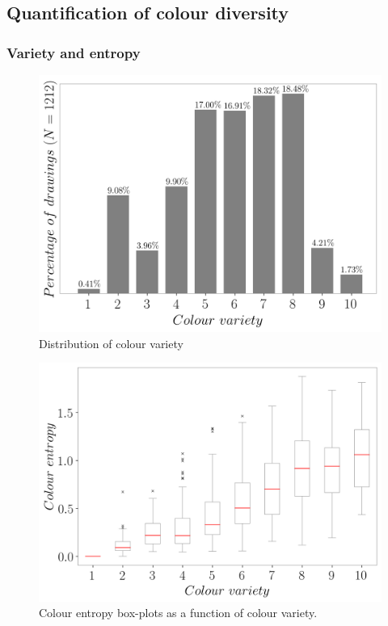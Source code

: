 \documentclass[11pt,a4paper]{article}
\begin{document}
\subsection{Quantification of colour diversity}
\label{sec:results_diversity}

\subsubsection{Variety and entropy}
\label{sec:results_entropy_variety}

\begin{figure}[h!]
	\centering
	\includegraphics[width=\linewidth]{figures/colors-boxplot-hist.png}
	\caption{Distribution of colour variety}
	\label{fig:variety_histogram}
\end{figure}


\begin{figure}
	\centering
	\includegraphics[width=\linewidth]{figures/colors-boxplot.png}
	\caption{Colour entropy box-plots as a function of colour variety.}
	\label{fig:entropy_boxplot}
\end{figure}
\end{document}
